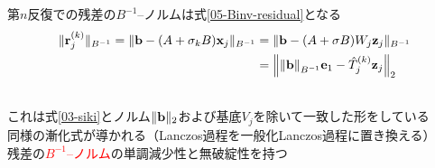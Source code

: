

第$n$反復での残差の$B^{-1}$--ノルムは式\eqref{05-Binv-residual}となる
\begin{align}
	\|\vb{r}_{j}^{(k)}\|_{B^{-1}} = \|\vb{b} - (A + \sigma_{k}B)\vb{x}_{j}\|_{B^{-1}}
		&= \|\vb{b} - (A + \sigma B)W_{j}\vb{z}_{j} \|_{B^{-1}} \notag \\
		&= \left\| \norm{\vb{b}}_{B^{-1}}\vb{e}_1 - \hat{T}_{j}^{(k)} \vb{z}_{j} \right\|_2\\
		\label{05-Binv-residual}
	&\hspace*{-17.5cm}\Rightarrow \ \vb{x}_{n}^{(k)} = \|\vb{b}\|_{B^{-1}} W_{j} R_{j}^{-1} Q_{j}^{\htop} \vb{e}_1
\end{align}
これは式\eqref{03-siki}とノルム$\|\vb{b}\|_2$および基底$V_{j}$を除いて一致した形をしている\\
\myitem 同様の漸化式が導かれる（Lanczos過程を一般化Lanczos過程に置き換える）\\
\myitem 残差の\textcolor{red}{$B^{-1}$--ノルム}の単調減少性と無破綻性を持つ